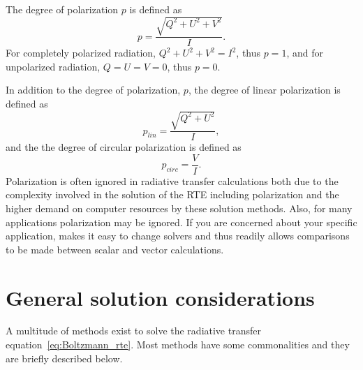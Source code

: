 The degree of polarization $p$ is defined as
\begin{equation}
  \label{eq:polarization:pol_degree}
  p = \frac{\sqrt{Q^2 + U^2 + V^2}}{I}.
\end{equation}
For completely polarized radiation, $Q^2 + U^2 + V^2 = I^2$, thus $p =
1$, and for unpolarized radiation, $Q = U = V = 0$, thus $p = 0$.

In addition to the degree of polarization, $p$, the degree of linear
polarization is defined as
\begin{equation}
  \label{eq:polarization:p_lin}
 p_{lin} = \frac{\sqrt{Q^2 + U^2}}{I},
\end{equation}
and the the degree of circular polarization is defined as
\begin{equation}
  \label{eq:polarization:p_circ}
 p_{circ} = \frac{V}{I}. 
\end{equation}
Polarization is often ignored in radiative transfer calculations both
due to the complexity involved in the solution of the RTE including
polarization and the higher demand on computer resources by these
solution methods. Also, for many applications polarization may be
ignored. If you are concerned about your specific application,
 makes it easy to change solvers and thus readily allows 
comparisons to be made between scalar and vector calculations.


\section{General solution considerations}
A multitude of methods exist to solve the radiative transfer
equation~\ref{eq:Boltzmann_rte}. Most methods have some commonalities
and they are briefly described below.

